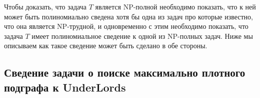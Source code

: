 \documentclass{article}
\begin{document}
Чтобы доказать, что задача $T$ является NP-полной необходимо показать, что к ней может быть полиномиально сведена хотя бы одна из задач про которые известно, что она является NP-трудной, и одновременно с этим необходимо показать, что задача $T$ имеет полиномиальное сведение к одной из NP-полных задач. Ниже мы описываем как такое сведение может быть сделано в обе стороны.



\subsection{Сведение задачи о поиске максимально плотного подграфа к UnderLords}
\end{document}
